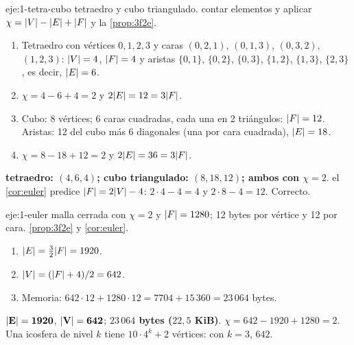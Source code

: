 \begin{solucion}{eje:1-tetra-cubo}
\datos tetraedro y cubo triangulado.
\planteamiento contar elementos y aplicar $\chi=\lvert V\rvert-\lvert E\rvert+\lvert F\rvert$ y la \cref{prop:3f2e}.
\pasos
\begin{enumerate}[label=\arabic*.]
  \item Tetraedro con vértices $0,1,2,3$ y caras $(0,2,1)$, $(0,1,3)$, $(0,3,2)$, $(1,2,3)$: $\lvert V\rvert=4$, $\lvert F\rvert=4$ y aristas $\{0,1\}$, $\{0,2\}$, $\{0,3\}$, $\{1,2\}$, $\{1,3\}$, $\{2,3\}$, es decir, $\lvert E\rvert=6$.
  \item $\chi=4-6+4=2$ y $2\lvert E\rvert=12=3\lvert F\rvert$.
  \item Cubo: 8 vértices; 6 caras cuadradas, cada una en 2 triángulos: $\lvert F\rvert=12$. Aristas: 12 del cubo más 6 diagonales (una por cara cuadrada), $\lvert E\rvert=18$.
  \item $\chi=8-18+12=2$ y $2\lvert E\rvert=36=3\lvert F\rvert$.
\end{enumerate}
\resultado \textbf{tetraedro: $(4,6,4)$; cubo triangulado: $(8,18,12)$; ambos con $\chi=2$}.
\comprobacion el \cref{cor:euler} predice $\lvert F\rvert=2\lvert V\rvert-4$: $2\cdot 4-4=4$ y $2\cdot 8-4=12$. Correcto.
\end{solucion}

\begin{solucion}{eje:1-euler}
\datos malla cerrada con $\chi=2$ y $\lvert F\rvert=1280$; 12 bytes por vértice y 12 por cara.
\planteamiento \cref{prop:3f2e} y \cref{cor:euler}.
\pasos
\begin{enumerate}[label=\arabic*.]
  \item $\lvert E\rvert=\tfrac32\lvert F\rvert=1920$.
  \item $\lvert V\rvert=(\lvert F\rvert+4)/2=642$.
  \item Memoria: $642\cdot 12+1280\cdot 12=7704+15\,360=23\,064$ bytes.
\end{enumerate}
\resultado $\mathbf{\lvert E\rvert=1920}$, $\mathbf{\lvert V\rvert=642}$; \textbf{$23\,064$ bytes ($22{,}5$ KiB)}.
\comprobacion $\chi=642-1920+1280=2$. Una icosfera de nivel $k$ tiene $10\cdot 4^k+2$ vértices: con $k=3$, $642$.
\end{solucion}

